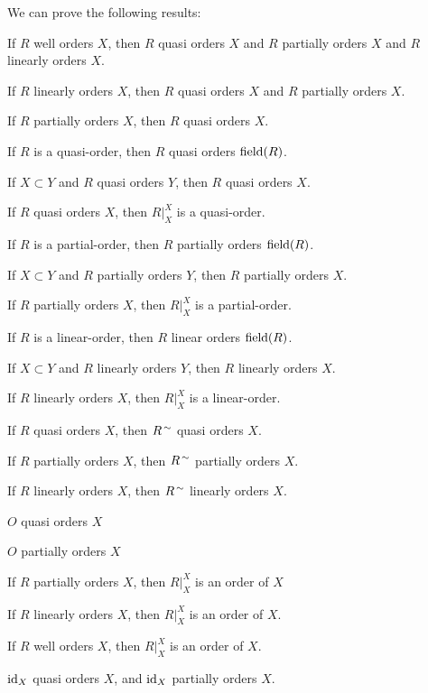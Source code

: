 \documentclass{article}
\begin{document}
We can prove the following results:
\begin{thm}
\item\label{orders1:28} If $R$ well orders $X$,
  then $R$ quasi orders $X$ and $R$ partially orders $X$ and $R$
  linearly orders $X$.
\item\label{orders1:29} If $R$ linearly orders $X$, then $R$ quasi
  orders $X$ and $R$ partially orders $X$. 
\item\label{orders1:30} If $R$ partially orders $X$, then $R$ quasi
  orders $X$.
\item\label{orders1:31} If $R$ is a quasi-order, then $R$ quasi orders $\operatorname{field}(R)$.
\item\label{orders1:32} If $X\subset Y$ and $R$ quasi orders $Y$,
  then $R$ quasi orders $X$.
\item\label{orders1:33} If $R$ quasi orders $X$, then $R|^{X}_{X}$ is a quasi-order.
\item\label{orders1:34} If $R$ is a partial-order, then $R$ partially
  orders $\operatorname{field}(R)$.
\item\label{orders1:35} If $X\subset Y$ and $R$ partially orders $Y$,
  then $R$ partially orders $X$.
\item\label{orders1:36} If $R$ partially orders $X$, then $R|^{X}_{X}$
  is a partial-order.
\item\label{orders1:37} If $R$ is a linear-order, then $R$ linear orders $\operatorname{field}(R)$.
\item\label{orders1:38} If $X\subset Y$ and $R$ linearly orders $Y$,
  then $R$ linearly orders $X$.
\item\label{orders1:39} If $R$ linearly orders $X$, then $R|^{X}_{X}$ is
  a linear-order.
\item\label{orders1:40} If $R$ quasi orders $X$, then $R^{\,\sim}$
  quasi orders $X$.
\item\label{orders1:41} If $R$ partially orders $X$, then $R^{\,\sim}$
  partially orders $X$.
\item\label{orders1:42} If $R$ linearly orders $X$, then $R^{\,\sim}$
  linearly orders $X$.
\item\label{orders1:43} $O$ quasi orders $X$ 
\item\label{orders1:44} $O$ partially orders $X$
\item\label{orders1:45} If $R$ partially orders $X$, then $R|^{X}_{X}$
  is an order of $X$
\item\label{orders1:46} If $R$ linearly orders $X$, then $R|^{X}_{X}$ is
  an order of $X$.
\item\label{orders1:47} If $R$ well orders $X$, then $R|^{X}_{X}$ is an
  order of $X$.
\item\label{orders1:48} $\operatorname{id}_{X}$ quasi orders $X$, and $\operatorname{id}_{X}$
  partially orders $X$.
\end{thm}
\end{document}
